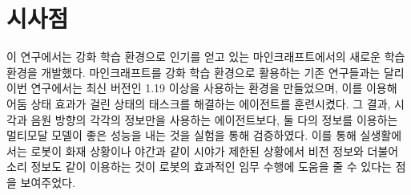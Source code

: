 \documentclass{tudelftposter}
\begin{document}
\section{시사점}
이 연구에서는 강화 학습 환경으로 인기를 얻고 있는 마인크래프트에서의 새로운 학습 환경을 개발했다. 마인크래프트를 강화 학습 환경으로 활용하는 기존 연구들과는 달리 이번 연구에서는 최신 버전인 1.19 이상을 사용하는 환경을 만들었으며, 이를 이용해 어둠 상태 효과가 걸린 상태의 태스크를 해결하는 에이전트를 훈련시켰다. 그 결과, 시각과 음원 방향의 각각의 정보만을 사용하는 에이전트보다, 둘 다의 정보를 이용하는 멀티모달 모델이 좋은 성능을 내는 것을 실험을 통해 검증하였다. 이를 통해 실생활에서는 로봇이 화재 상황이나 야간과 같이 시야가 제한된 상황에서 비전 정보와 더불어 소리 정보도 같이 이용하는 것이 로봇의 효과적인 임무 수행에 도움을 줄 수 있다는 점을 보여주었다.

% 
\end{document}
